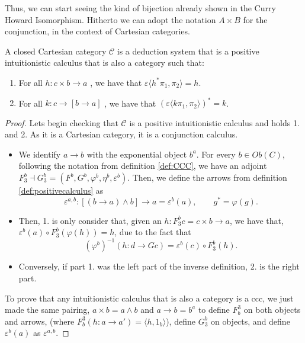 Thus, we can start seeing the kind of bijection already shown in the Curry Howard Isomorphism. Hitherto we can adopt the notation $A\times B$ for the conjunction, in the context of Cartesian categories.
\begin{proposition}\label{def2:CCC}
  A closed Cartesian category $\mathcal{C}$ is a deduction system that is a positive intuitionistic calculus that is also a category such that:
  \begin{enumerate}
  \item   For all $h: c\times b \to a$ , we have that $\varepsilon \langle h^* \pi_1, \pi_2\rangle = h$.
  \item   For all $k: c\to [b \to a]$ , we have that $(\varepsilon \langle k \pi_1, \pi_2\rangle)^* = k$.
  \end{enumerate}
\end{proposition}

\begin{proof}
  
  Lets begin checking that $\mathcal{C}$ is a positive intuitionistic calculus and holds 1. and 2. As it is a Cartesian category, it is a conjunction calculus.
  \begin{itemize}
  \item We identify $a\to b$ with the exponential object $b^a$. For every $b\in Ob(C)$, following the notation from definition \ref{def:CCC}, we have an adjoint $F_3^b\dashv G_3^b = (F^b,G^b,\varphi^b,\eta^b,\varepsilon^b)$. Then, we define the arrows from definition \ref{def:positivecalculus} as
    $$\varepsilon^{a,b}: [(b \to a) \land b]\to a = \varepsilon^b(a), \qquad g^* = \varphi(g).$$
  \item Then, 1. is only consider that, given an $h: F_3^b c = c\times b \to a$, we have that, $\varepsilon^b(a) \circ F_3^b(\varphi(h)) = h$, due to the fact that $$(\varphi^b)^{-1}(h: d \to Gc) = \varepsilon^b(c)\circ F_3^b(h).$$
  \item Conversely, if part 1. was the left part of the inverse definition, 2. is the right part.
  \end{itemize}

  To prove that any intuitionistic calculus that is also a category is a ccc, we just made the same pairing, $a\times b = a\land b$ and $a\to b = b^a$ to define $F_b^3$ on both objects and arrows, (where $F_b^3(h:a\to a') = \langle h, 1_b\rangle $), define $G_3^b$ on objects, and define $\varepsilon^b(a)$ as $\varepsilon^{a,b}$.
\end{proof}







